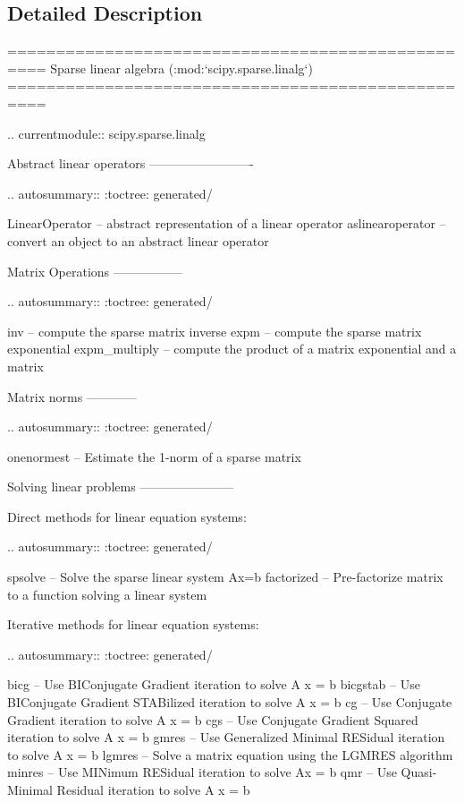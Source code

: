 \subsection{Detailed Description}
\begin{DoxyVerb}==================================================
Sparse linear algebra (:mod:`scipy.sparse.linalg`)
==================================================

.. currentmodule:: scipy.sparse.linalg

Abstract linear operators
-------------------------

.. autosummary::
   :toctree: generated/

   LinearOperator -- abstract representation of a linear operator
   aslinearoperator -- convert an object to an abstract linear operator

Matrix Operations
-----------------

.. autosummary::
   :toctree: generated/

   inv -- compute the sparse matrix inverse
   expm -- compute the sparse matrix exponential
   expm_multiply -- compute the product of a matrix exponential and a matrix

Matrix norms
------------

.. autosummary::
   :toctree: generated/

   onenormest -- Estimate the 1-norm of a sparse matrix

Solving linear problems
-----------------------

Direct methods for linear equation systems:

.. autosummary::
   :toctree: generated/

   spsolve -- Solve the sparse linear system Ax=b
   factorized -- Pre-factorize matrix to a function solving a linear system

Iterative methods for linear equation systems:

.. autosummary::
   :toctree: generated/

   bicg -- Use BIConjugate Gradient iteration to solve A x = b
   bicgstab -- Use BIConjugate Gradient STABilized iteration to solve A x = b
   cg -- Use Conjugate Gradient iteration to solve A x = b
   cgs -- Use Conjugate Gradient Squared iteration to solve A x = b
   gmres -- Use Generalized Minimal RESidual iteration to solve A x = b
   lgmres -- Solve a matrix equation using the LGMRES algorithm
   minres -- Use MINimum RESidual iteration to solve Ax = b
   qmr -- Use Quasi-Minimal Residual iteration to solve A x = b


\end{DoxyVerb}

